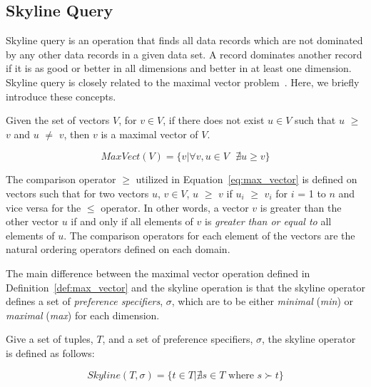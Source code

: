 
\subsection{Skyline Query}\label{sec:skyline_operator}

Skyline query is an operation that finds all data records which
are not dominated by any other data records in a given data set. A
record dominates another record if it is as good or better in all
dimensions and better in at least one dimension. Skyline query is
closely related to the maximal vector
problem~\cite{journals/jacm/KungLP75,conf/vldb/GodfreySG05}. Here,
we briefly introduce these concepts.

\begin{definition}\label{def:max_vector}
Given the set of vectors $V$, for $v \in V$, if there does not
exist $u \in V$ such that $u$ $\geq$ $v$ and $u$ $\neq$ $v$, then
$v$ is a maximal vector of $V$.

\begin{equation}\label{eq:max_vector}
    MaxVect(V) = \{v | \forall v, u \in V \mbox{ } \nexists u \geq v\}
\end{equation}

\end{definition}

The comparison operator $\geq$ utilized in
Equation~\ref{eq:max_vector} is defined on vectors such that for
two vectors $u$, $v \in V$, $u$ $\geq$ $v$ if $u_i$ $\geq$ $v_i$
for $i$ = 1 to $n$ and vice versa for the $\leq$ operator. In
other words, a vector $v$ is greater than the other vector $u$ if
and only if all elements of $v$ is \emph{greater than or equal to}
all elements of $u$. The comparison operators for each element of
the vectors are the natural ordering operators defined on each
domain.

The main difference between the maximal vector operation defined
in Definition~\ref{def:max_vector} and the skyline operation is
that the skyline operator defines a set of \emph{preference
specifiers}, $\sigma$, which are to be either \emph{minimal}
(\emph{min}) or \emph{maximal} (\emph{max}) for each dimension.


\begin{definition}\label{def:skyline}
Give a set of tuples, $T$, and a set of preference specifiers,
$\sigma$, the skyline operator is defined as follows:

\begin{equation}\label{eq:skyline}
    Skyline(T, \sigma) = \{t \in T | \nexists s \in T \text{ where } s \succ t \}
\end{equation}

\end{definition}

